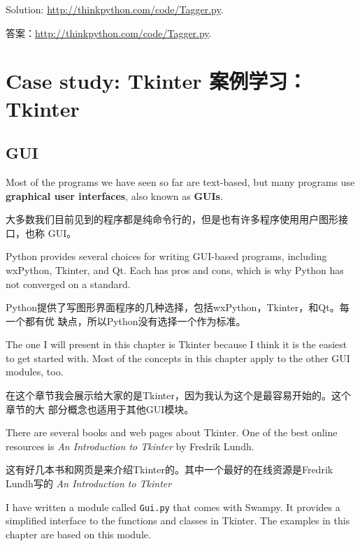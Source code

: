 \documentclass[10pt]{book}
\begin{document}
\begin{CJK}{UTF8}{gbsn}
\begin{exercise}
\begin{enumerate}
\end{enumerate}

Solution: \url{http://thinkpython.com/code/Tagger.py}.

答案：\url{http://thinkpython.com/code/Tagger.py}.

\end{exercise}



\chapter{Case study: Tkinter  案例学习：Tkinter}
\label{tkinter}

\section{GUI}

Most of the programs we have seen so far are text-based, but
many programs use {\bf graphical user interfaces}, also
known as {\bf GUIs}.

大多数我们目前见到的程序都是纯命令行的，但是也有许多程序使用用户图形接口，也称
GUI。

Python provides several choices for writing GUI-based programs,
including wxPython, Tkinter, and Qt.  Each has pros and cons, which
is why Python has not converged on a standard.

Python提供了写图形界面程序的几种选择，包括wxPython，Tkinter，和Qt。每一个都有优
缺点，所以Python没有选择一个作为标准。

The one I will present in this chapter is Tkinter because I think
it is the easiest to get started with.  Most of the concepts
in this chapter apply to the other GUI modules, too.

在这个章节我会展示给大家的是Tkinter，因为我认为这个是最容易开始的。这个章节的大
部分概念也适用于其他GUI模块。

There are several books and web pages about Tkinter.  One of
the best online resources is {\em An Introduction to Tkinter}
by Fredrik Lundh.

这有好几本书和网页是来介绍Tkinter的。其中一个最好的在线资源是Fredrik Lundh写的
{\em An Introduction to Tkinter}

I have written a module called {\tt Gui.py} that comes with
Swampy.  It provides a simplified interface to the functions
and classes in Tkinter.  The examples in this chapter are
based on this module.


\end{CJK}
\end{document}
